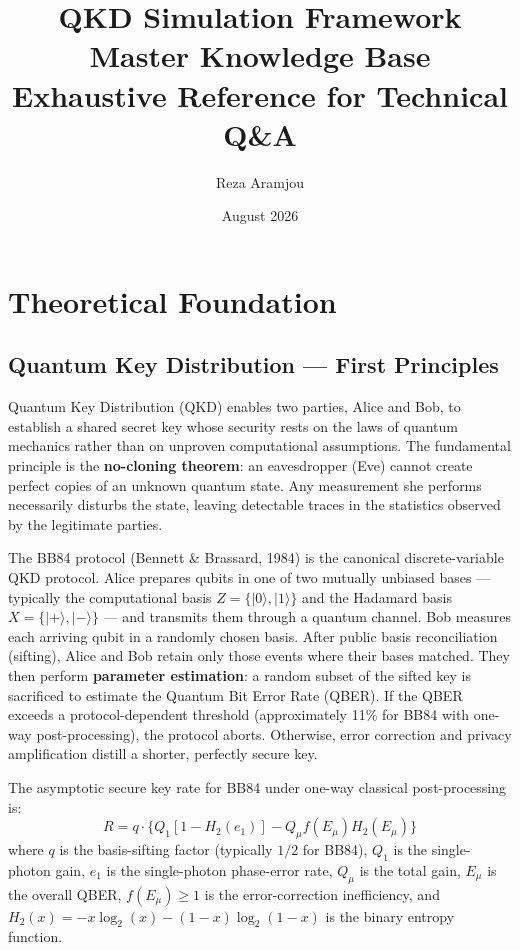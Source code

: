 \documentclass[11pt,a4paper,oneside]{report}
\title{\textbf{QKD Simulation Framework\\[4pt] Master Knowledge Base\\[4pt] \large Exhaustive Reference for Technical Q\&A}}
\author{Reza Aramjou}
\date{August 2026}
\begin{document}
\maketitle
\tableofcontents
\newpage

\chapter{Theoretical Foundation}

\section{Quantum Key Distribution — First Principles}

Quantum Key Distribution (QKD) enables two parties, Alice and Bob, to establish a shared secret key whose security rests on the laws of quantum mechanics rather than on unproven computational assumptions. The fundamental principle is the \textbf{no-cloning theorem}: an eavesdropper (Eve) cannot create perfect copies of an unknown quantum state. Any measurement she performs necessarily disturbs the state, leaving detectable traces in the statistics observed by the legitimate parties.

The BB84 protocol (Bennett \& Brassard, 1984) is the canonical discrete-variable QKD protocol. Alice prepares qubits in one of two mutually unbiased bases — typically the computational basis $Z = \{|0\rangle,|1\rangle\}$ and the Hadamard basis $X = \{|+\rangle,|-\rangle\}$ — and transmits them through a quantum channel. Bob measures each arriving qubit in a randomly chosen basis. After public basis reconciliation (sifting), Alice and Bob retain only those events where their bases matched. They then perform \textbf{parameter estimation}: a random subset of the sifted key is sacrificed to estimate the Quantum Bit Error Rate (QBER). If the QBER exceeds a protocol-dependent threshold (approximately 11\% for BB84 with one-way post-processing), the protocol aborts. Otherwise, error correction and privacy amplification distill a shorter, perfectly secure key.

The asymptotic secure key rate for BB84 under one-way classical post-processing is:
\begin{equation}
R = q \cdot \bigl\{ Q_1[1 - H_2(e_1)] - Q_\mu f(E_\mu) H_2(E_\mu) \bigr\}
\label{eq:asymp_rate}
\end{equation}
where $q$ is the basis-sifting factor (typically $1/2$ for BB84), $Q_1$ is the single-photon gain, $e_1$ is the single-photon phase-error rate, $Q_\mu$ is the total gain, $E_\mu$ is the overall QBER, $f(E_\mu) \geq 1$ is the error-correction inefficiency, and $H_2(x) = -x\log_2(x) - (1-x)\log_2(1-x)$ is the binary entropy function.
\end{document}
